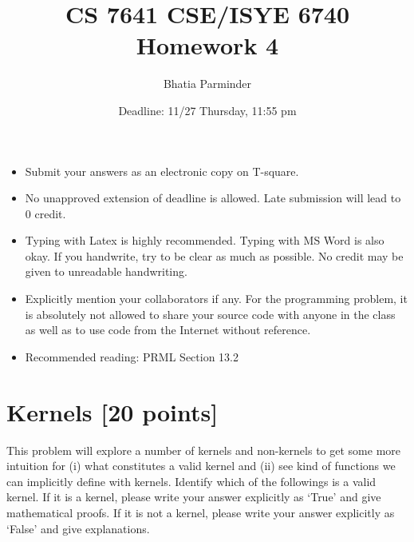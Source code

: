 \documentclass[twoside,11pt]{article}\usepackage{amsmath,amsfonts,amsthm,fullpage}
\begin{document}
\title{CS 7641 CSE/ISYE 6740 Homework 4}
\author{Bhatia Parminder}
\date{Deadline: 11/27 Thursday, 11:55 pm}
\maketitle

\begin{itemize}
  \item Submit your answers as an electronic copy on T-square.
  \item No unapproved extension of deadline is allowed. Late
  submission will lead to 0 credit.
  \item Typing with Latex is highly recommended. Typing with MS Word is also okay.
  If you handwrite, try to be clear as much as possible. No credit may be given to unreadable handwriting.
  \item Explicitly mention your collaborators if any. For the programming problem, it is
  absolutely not allowed to share your source code with anyone in the
  class as well as to use code from the Internet without reference.
  \item Recommended reading: PRML Section 13.2
 \end{itemize}
 

\section{Kernels [20 points]}
This problem will explore a number of kernels and non-kernels to get some more intuition for (i) what constitutes a valid kernel and (ii) see kind of functions we can implicitly define with kernels. Identify which of the followings is a valid kernel.  If it is a kernel, please write your answer explicitly as `True' and give mathematical proofs. If it is not a kernel, please write your answer explicitly as `False' and give explanations. 
\end{document}
